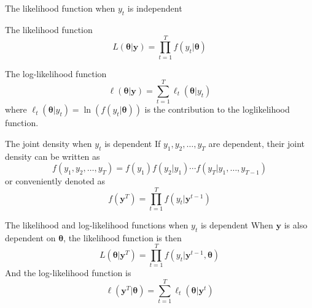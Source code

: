 \documentclass[presentation,10pt]{beamer}
\begin{document}
\begin{frame}[label={sec:orgfa2f1cd}]{The likelihood function when \(y_t\) is independent}
\begin{block}{The likelihood function}
\begin{equation}
\label{eq:general-likelihood}
L(\boldsymbol{\theta} | \mathbf{y}) = \prod_{t=1}^T f(y_t | \boldsymbol{\theta})
\end{equation}
\end{block}

\begin{block}{The log-likelihood function}
\begin{equation}
\label{eq:general-logL}
\ell(\boldsymbol{\theta} | \mathbf{y}) = \sum_{t=1}^T \ell_t(\boldsymbol{\theta} | y_t)
\end{equation}
where \(\ell_t(\boldsymbol{\theta} | y_t) = \ln\left(f(y_t |
\boldsymbol{\theta})\right)\) is the \alert{contribution} to the
loglikelihood function.
\end{block}
\end{frame}

\begin{frame}[label={sec:orgd9dc07b}]{The joint density when \(y_t\) is dependent}
If \(y_1, y_2, \ldots, y_T\) are dependent, their joint density can be
written as
\[ f(y_1, y_2, \ldots, y_T) = f(y_1) f(y_2 | y_1) \cdots f(y_T | y_1,
\ldots, y_{T-1}) \]
or conveniently denoted as
\[f(\mathbf{y}^T) = \prod_{t=1}^T f(y_t | \mathbf{y}^{t-1}) \]
\end{frame}

\begin{frame}[label={sec:orgc103fb1}]{The likelihood and log-likelihood functions when \(y_t\) is dependent}
When \(\mathbf{y}\) is also dependent on \(\boldsymbol{\theta}\), the
likelihood function is then
\begin{equation}
\label{eq:depend-likelihood}
L(\boldsymbol{\theta} | \mathbf{y}^T) = \prod_{t=1}^T f(y_t | \mathbf{y}^{t-1}, \boldsymbol{\theta})
\end{equation}
And the log-likelihood function is
\begin{equation}
\label{eq:depend-logL}
\ell(\mathbf{y}^T | \boldsymbol{\theta}) = \sum_{t=1}^T \ell_t(\boldsymbol{\theta} | \mathbf{y}^{t})
\end{equation}
\end{frame}
\end{document}
